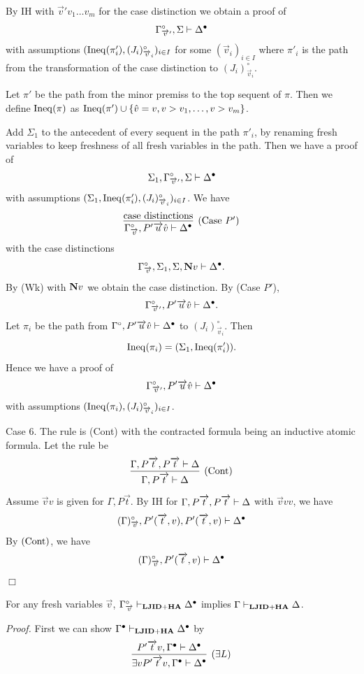 By IH with $\Vec v'v_1\ldots v_m$ for the case distinction
we obtain a proof of
\[
\Gamma^\circ_{\overrightarrow v'}, \Sigma \mathrel \vdash \Delta^\bullet
\]
with assumptions $({\rm Ineq}(\pi'_i),(J_i)^\circ_{\overrightarrow v_i})_{i \in I}$
for some $(\Vec v_i)_{i \in I}$
where 
$\pi'_i$ is the path from the transformation of the case distinction
to $(J_i)^\circ_{\Vec v_i}$.

Let $\pi'$ be the path from the minor premiss to the top sequent of $\pi$.
Then we define ${\rm Ineq}(\pi)$ as
${\rm Ineq}(\pi') \cup \{\hat v=v,v>v_1,\ldots,v>v_m\}$.

Add $\Sigma_1$
to the antecedent of every sequent in the path $\pi'_i$,
by renaming fresh variables to keep freshness of all fresh variables
in the path.
Then we have a proof of
\[
\Sigma_1,
\Gamma^\circ_{\overrightarrow v'}, \Sigma \mathrel \vdash \Delta^\bullet
\]
with assumptions $(\Sigma_1,{\rm Ineq}(\pi_i'),(J_i)^\circ_{\overrightarrow v_i})_{i \in I}$.
We have
\[
\infer[(\Case\ P')]{\Gamma^\circ_{\Vec v}, P'\Vec u\hat v \prove \Delta^\bullet}{
\hbox{case distinctions}
}
\]
with the case distinctions
\[
\Gamma^\circ_{\overrightarrow v}, \Sigma_1,\Sigma, {\bf N} v \mathrel \vdash \Delta^\bullet.
\]
By (Wk) with ${\bf N} v$ we obtain the case distinction.
By (Case $P'$),
\[
\Gamma^\circ_{\overrightarrow v'}, P'\overrightarrow u\hat v \mathrel \vdash \Delta^\bullet.
\]
Let $\pi_i$ be the path from $\Gamma^\circ, P'\overrightarrow u\hat v \mathrel \vdash \Delta^\bullet$
to $(J_i)^\circ_{\Vec v_i}$.
Then
\[
{\rm Ineq}(\pi_i) = (\Sigma_1,{\rm Ineq}(\pi'_i)).
\]
Hence we have a proof of
\[
\Gamma^\circ_{\overrightarrow v'}, P'\overrightarrow u\hat v \mathrel \vdash \Delta^\bullet
\]
with assumptions $({\rm Ineq}(\pi_i),(J_i)^\circ_{\overrightarrow v_i})_{i \in I}$.

Case 6. The rule is (Cont) with the contracted formula being an
inductive atomic formula.
Let the rule be
\[
\infer[(\Cont)]{\Gamma,P\Vec t \prove \Delta}{
\Gamma,P\Vec t,P\Vec t \prove \Delta
}
\]
Assume $\Vec vv$ is given for $\Gamma,P\Vec t$.
By IH for $\Gamma,P\overrightarrow t,P\overrightarrow t \mathrel \vdash \Delta$ with $\Vec vvv$,
we have
\[
(\Gamma)^\circ_{\overrightarrow v},P'(\overrightarrow t,v),P'(\overrightarrow t,v) \mathrel \vdash \Delta^\bullet
\]
By $({\rm Cont})$, we have
\[
(\Gamma)^\circ_{\overrightarrow v},P'(\overrightarrow t,v) \mathrel \vdash \Delta^\bullet
\]
$\Box$

\begin{Prop}\label{prop:birthtrans2}
For any fresh variables $\Vec v$,
$\Gamma^\circ_{\overrightarrow v} \mathrel \vdash_{{\bf LJID}+{\bf HA}} \Delta^\bullet$ 
implies $\Gamma \mathrel \vdash_{{\bf LJID}+{\bf HA}} \Delta$.
\end{Prop}

{\em Proof.}
First we can show $\Gamma^\bullet \mathrel \vdash_{{\bf LJID}+{\bf HA}} \Delta^\bullet$
by 
\[
\infer[(\exists L)]{
\exists v P'\Vec tv,\Gamma^\bullet \prove \Delta^\bullet}{
P'\Vec tv,\Gamma^\bullet \prove \Delta^\bullet
}
\]

